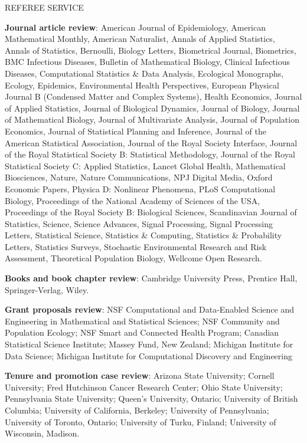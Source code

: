 \begin{mylist}{REFEREE SERVICE} %
\item {\bf Journal article review}: 
American Journal of Epidemiology,
American Mathematical Monthly,
American Naturalist,
Annals of Applied Statistics,
Annals of Statistics,
Bernoulli,
Biology Letters,
Biometrical Journal,
Biometrics,
BMC Infectious Diseases,
Bulletin of Mathematical Biology,
Clinical Infectious Diseases,
Computational Statistics \& Data Analysis,
Ecological Monographs,
Ecology,
Epidemics,
Environmental Health Perspectives,
European Physical Journal B (Condensed Matter and Complex Systems),
Health Economics,
Journal of Applied Statistics,
Journal of Biological Dynamics,
Journal of Biology,
Journal of Mathematical Biology,
Journal of Multivariate Analysis,
Journal of Population Economics,
Journal of Statistical Planning and Inference,
Journal of the American Statistical Association, 
Journal of the Royal Society Interface,  
Journal of the Royal Statistical Society B: Statistical Methodology,
Journal of the Royal Statistical Society C: Applied Statistics,
Lancet Global Health,
Mathematical Biosciences,
Nature,
Nature Communications,
NPJ Digital Media,
Oxford Economic Papers,
Physica D: Nonlinear Phenomena,
PLoS Computational Biology,
Proceedings of the National Academy of Sciences of the USA,
Proceedings of the Royal Society B: Biological Sciences,
Scandinavian Journal of Statistics,
Science,
Science Advances,
Signal Processing,
Signal Processing Letters,
Statistical Science,
Statistics \& Computing,
Statistics \& Probability Letters,
Statistics Surveys,
Stochastic Environmental Research and Risk Assessment,
Theoretical Population Biology,
Wellcome Open Research.

\item {\bf Books and book chapter review}:
Cambridge University Press, 
Prentice Hall,
 Springer-Verlag,  
 Wiley.

\item {\bf Grant proposals review}: 
NSF Computational and Data-Enabled Science and Engineering in Mathematical and Statistical Sciences;
NSF Community and Population Ecology;
NSF Smart and Connected Health Program;
Canadian Statistical Science Institute;
Massey Fund, New Zealand;
Michigan Institute for Data Science;
Michigan Institute for Computational Discovery and Engineering

\item {\bf Tenure and promotion case review}:
Arizona State University;
Cornell University;
Fred Hutchinson Cancer Research Center;
Ohio State University;
Pennsylvania State University;
Queen's University, Ontario;
University of British Columbia;
University of California, Berkeley;
University of Pennsylvania;
University of Toronto, Ontario;
University of Turku, Finland;
University of Wisconsin, Madison.

\end{mylist}

